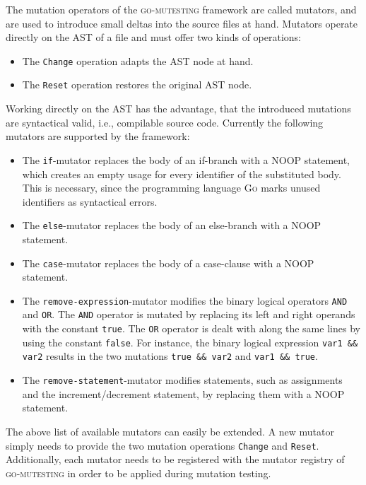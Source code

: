 The mutation operators of the \textsc{go-mutesting} framework are called mutators, and are used to introduce small deltas into the source files at hand. Mutators operate directly on the AST of a file and must offer two kinds of operations:
\begin{itemize}
\item The \texttt{Change} operation adapts the AST node at hand.
\item The \texttt{Reset} operation restores the original AST node.
\end{itemize}

Working directly on the AST has the advantage, that the introduced mutations are syntactical valid, i.e., compilable source code. Currently the following mutators are supported by the framework:

\begin{itemize}
\item The \texttt{if}-mutator replaces the body of an if-branch with a NOOP statement, which creates an empty usage for every identifier of the substituted body. This is necessary, since the programming language \textsc{Go} marks unused identifiers as syntactical errors.
\item The \texttt{else}-mutator replaces the body of an else-branch with a NOOP statement.
\item The \texttt{case}-mutator replaces the body of a case-clause with a NOOP statement.
\item The \texttt{remove-expression}-mutator modifies the binary logical operators \texttt{AND} and \texttt{OR}. The \texttt{AND} operator is mutated by replacing its left and right operands with the constant \texttt{true}. The \texttt{OR} operator is dealt with along the same lines by using the constant \texttt{false}. For instance, the binary logical expression \texttt{var1 \&\& var2} results in the two mutations \texttt{true \&\& var2} and \texttt{var1 \&\& true}.
\item The \texttt{remove-statement}-mutator modifies statements, such as assignments and the increment/decrement statement, by replacing them with a NOOP statement.
\end{itemize}

The above list of available mutators can easily be extended. A new mutator simply needs to provide the two mutation operations \texttt{Change} and \texttt{Reset}. Additionally, each mutator needs to be registered with the mutator registry of \textsc{go-mutesting} in order to be applied during mutation testing.

